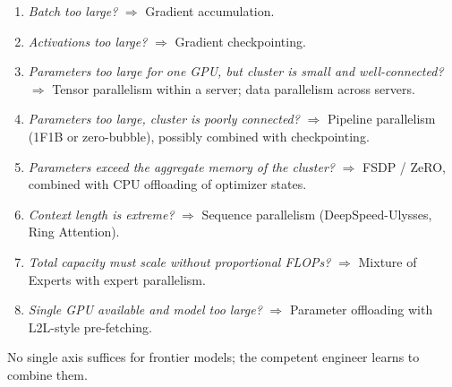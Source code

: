 \documentclass[11pt,a4paper]{article}
\theoremstyle{definition}
\theoremstyle{remark}
\theoremstyle{plain}
\begin{document}
\begin{enumerate}[leftmargin=1.8em, itemsep=2pt]
    \item \emph{Batch too large?} $\Rightarrow$ Gradient accumulation.
    \item \emph{Activations too large?} $\Rightarrow$ Gradient
    checkpointing.
    \item \emph{Parameters too large for one GPU, but cluster is small
    and well-connected?} $\Rightarrow$ Tensor parallelism within a
    server; data parallelism across servers.
    \item \emph{Parameters too large, cluster is poorly connected?}
    $\Rightarrow$ Pipeline parallelism (1F1B or zero-bubble), possibly
    combined with checkpointing.
    \item \emph{Parameters exceed the aggregate memory of the cluster?}
    $\Rightarrow$ FSDP / ZeRO, combined with CPU offloading of optimizer
    states.
    \item \emph{Context length is extreme?} $\Rightarrow$ Sequence
    parallelism (DeepSpeed-Ulysses, Ring Attention).
    \item \emph{Total capacity must scale without proportional FLOPs?}
    $\Rightarrow$ Mixture of Experts with expert parallelism.
    \item \emph{Single GPU available and model too large?} $\Rightarrow$
    Parameter offloading with L2L-style pre-fetching.
\end{enumerate}

No single axis suffices for frontier models; the competent engineer
learns to combine them.
\end{document}
